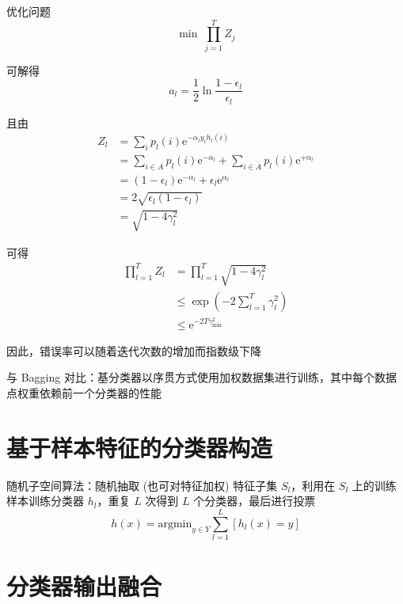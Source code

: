\documentclass[openany]{ctexbook}
\theoremstyle{kaiti}
\theoremstyle{normal}
\begin{document}
优化问题
\begin{equation}
\min~\prod_{j=1}^{T}Z_j
\end{equation}

可解得
\begin{equation}
a_l=\frac{1}{2}\ln\frac{1-\epsilon_l}{\epsilon_l}
\end{equation}

且由
\begin{equation}
\begin{aligned}
  Z_l
  &=\sum_ip_l(i)\mathrm{e}^{-\alpha_ly_ih_l(i)}\\
  &=\sum_{i\in A}p_l(i)\mathrm{e}^{-\alpha_l}+\sum_{i\in \bar{A}}p_l(i)\mathrm{e}^{+\alpha_l}\\
  &=\left(1-\epsilon_l \right)\mathrm{e}^{-\alpha_l}+\epsilon_l\mathrm{e}^{\alpha_l}\\
  &=2\sqrt{\epsilon_l\left(1-\epsilon_l \right)}\\
  &=\sqrt{1-4\gamma_{l}^{2}}
\end{aligned}
\end{equation}

可得
\begin{equation}
\begin{aligned}
  \prod_{l=1}^{T}Z_l
  &=\prod_{l=1}^{T}\sqrt{1-4\gamma_{l}^{2}}\\
  &\leqslant \exp \left(-2\sum_{l=1}^{T}\gamma_{l}^{2} \right)\\
  &\leqslant \mathrm{e}^{-2T\gamma_{\min}^{2}}
\end{aligned}
\end{equation}

因此，错误率可以随着迭代次数的增加而指数级下降

与 Bagging 对比：基分类器以序贯方式使用加权数据集进行训练，其中每个数据点权重依赖前一个分类器的性能

\section{基于样本特征的分类器构造}

随机子空间算法：随机抽取 (也可对特征加权) 特征子集 $S_l$，利用在 $S_l$ 上的训练样本训练分类器 $h_l$，重复 $L$ 次得到 $L$ 个分类器，最后进行投票
\begin{equation}
h(x)=\mathrm{argmin}_{y\in Y}\sum_{l=1}^{L}\left[h_l(x)=y \right]
\end{equation}

\section{分类器输出融合}
\end{document}
